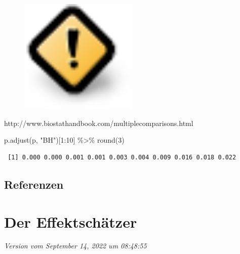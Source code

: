 \documentclass[
  letterpaper,
]{scrbook}
\newenvironment{Shaded}{\begin{snugshade}}{\end{snugshade}}
\newcommand{\DecValTok}[1]{\textcolor[rgb]{0.68,0.00,0.00}{#1}}
\newcommand{\FunctionTok}[1]{\textcolor[rgb]{0.28,0.35,0.67}{#1}}
\newcommand{\NormalTok}[1]{\textcolor[rgb]{0.00,0.23,0.31}{#1}}
\newcommand{\SpecialCharTok}[1]{\textcolor[rgb]{0.37,0.37,0.37}{#1}}
\newcommand{\StringTok}[1]{\textcolor[rgb]{0.13,0.47,0.30}{#1}}
\begin{document}
\begin{figure}

{\centering \includegraphics[width=0.5\textwidth,height=\textheight]{./images/caution.png}

}

\end{figure}

http://www.biostathandbook.com/multiplecomparisons.html

\begin{Shaded}
\begin{Highlighting}[]
\FunctionTok{p.adjust}\NormalTok{(p, }\StringTok{"BH"}\NormalTok{)[}\DecValTok{1}\SpecialCharTok{:}\DecValTok{10}\NormalTok{] }\SpecialCharTok{\%\textgreater{}\%} \FunctionTok{round}\NormalTok{(}\DecValTok{3}\NormalTok{)}
\end{Highlighting}
\end{Shaded}

\begin{verbatim}
 [1] 0.000 0.000 0.001 0.001 0.003 0.004 0.009 0.016 0.018 0.022
\end{verbatim}

\hypertarget{referenzen-4}{%
\section*{Referenzen}\label{referenzen-4}}

\hypertarget{sec-effect}{%
\chapter{Der Effektschätzer}\label{sec-effect}}

\emph{Version vom September 14, 2022 um 08:48:55}

\end{document}
